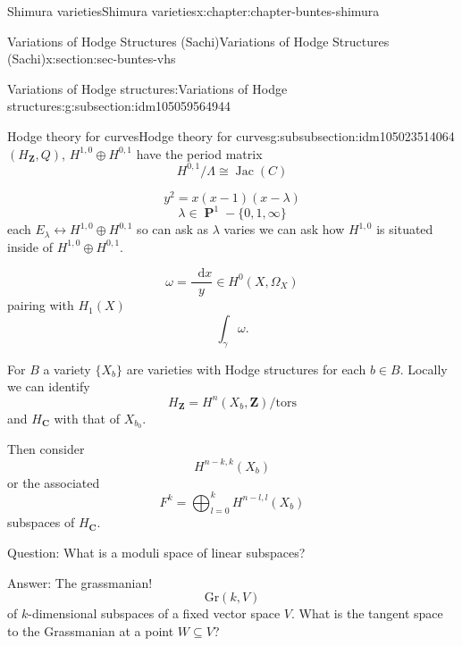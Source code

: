 \documentclass[oneside,10pt,]{book}
\numberwithin{equation}{section}
\newcommand{\diff}{\mathop{}\!\mathrm{d}}
\newcommand{\ZZ}{\mathbf{Z}}
\newcommand{\CC}{\mathbf{C}}
\newcommand{\tors}{\mathrm{tors}}
\DeclareMathOperator{\Jac}{Jac}
\DeclareMathOperator{\PP}{\mathbf{P}}
\begin{document}
\begin{chapterptx}{Shimura varieties}{}{Shimura varieties}{}{}{x:chapter:chapter-buntes-shimura}
\begin{sectionptx}{Variations of Hodge Structures (Sachi)}{}{Variations of Hodge Structures (Sachi)}{}{}{x:section:sec-buntes-vhs}
\begin{subsectionptx}{Variations of Hodge structures:}{}{Variations of Hodge structures:}{}{}{g:subsection:idm105059564944}
%
%
\typeout{************************************************}
\typeout{************************************************}
%
\begin{subsubsectionptx}{Hodge theory for curves}{}{Hodge theory for curves}{}{}{g:subsubsection:idm105023514064}
\((H_\ZZ, Q)\), \(H^{1,0} \oplus H^{0,1}\) have the period matrix%
\begin{equation*}
H^{0,1}/\Lambda \cong \Jac(C)
\end{equation*}
%
\par
%
\begin{equation*}
y^2 = x(x-1)(x-\lambda)
\end{equation*}
%
\begin{equation*}
\lambda \in \PP^1 - \{0,1,\infty\}
\end{equation*}
each \(E_\lambda \leftrightarrow H^{1,0} \oplus H^{0,1}\) so can ask as \(\lambda\) varies we can ask how \(H^{1,0}\) is situated inside of \(H^{1,0} \oplus H^{0,1}\).%
\par
%
\begin{equation*}
\omega = \frac{\diff x}{y} \in H^0(X,\Omega_X)
\end{equation*}
pairing with \(H_1(X)\)%
\begin{equation*}
\int_\gamma \omega\text{.}
\end{equation*}
%
\par
For \(B\) a variety \(\{X_b\}\) are varieties with Hodge structures for each \(b\in B\). Locally we can identify%
\begin{equation*}
H_\ZZ = H^n(X_b , \ZZ)/\tors
\end{equation*}
and \(H_\CC \) with that of \(X_{b_0}\).%
\par
Then consider%
\begin{equation*}
H^{n-k, k}(X_b)
\end{equation*}
or the associated%
\begin{equation*}
F^k = \bigoplus_{l=0}^k H^{n-l,l}(X_b)
\end{equation*}
subspaces of \(H_\CC\).%
\par
Question: What is a moduli space of linear subspaces?%
\par
Answer: The grassmanian!%
\begin{equation*}
{\mathrm{Gr}}(k,V)
\end{equation*}
of \(k\)-dimensional subspaces of a fixed vector space \(V\). What is the tangent space to the Grassmanian at a point \(W\subseteq V\)?%

\end{subsubsectionptx}
\end{subsectionptx}
\end{sectionptx}
\end{chapterptx}
\end{document}
